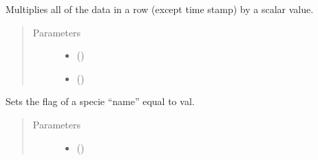 \documentclass[letterpaper,10pt,openany,oneside,english]{sphinxmanual}
\begin{document}
\begin{fulllineitems}
\begin{fulllineitems}
\begin{quote}
\begin{description}
\begin{itemize}
\end{itemize}

\end{description}\end{quote}

\end{fulllineitems}


\begin{fulllineitems}
\label{\detokenize{support_rst/phase:phase.Phase.ScaleRow}}
Multiplies all of the data in a row (except time stamp) by a scalar
value.
\begin{quote}\begin{description}
\item[{Parameters}] \leavevmode\begin{itemize}
\item {} 
 () \textendash{} 

\item {} 
 () \textendash{} 

\end{itemize}

\end{description}\end{quote}

\end{fulllineitems}


\begin{fulllineitems}
\label{\detokenize{support_rst/phase:phase.Phase.SetSpecieId}}
Sets the flag of a specie “name” equal to val.
\begin{quote}\begin{description}
\item[{Parameters}] \leavevmode\begin{itemize}
\item {} 
 () \textendash{} 


\end{itemize}
\end{description}
\end{quote}
\end{fulllineitems}
\end{fulllineitems}
\end{document}
